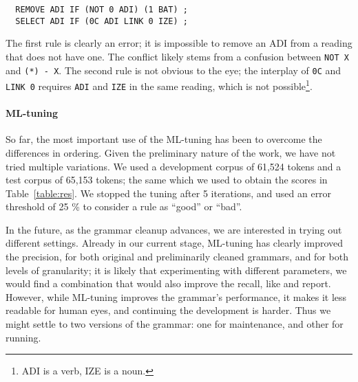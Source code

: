 {{\begin{verbatim}
  REMOVE ADI IF (NOT 0 ADI) (1 BAT) ;
  SELECT ADI IF (0C ADI LINK 0 IZE) ;
\end{verbatim}

\noindent The first rule is clearly an error; it is impossible to remove an ADI from a reading that does not have one.
The conflict likely stems from a confusion between \texttt{NOT X} and \texttt{(*) - X}.
The second rule is not obvious to the eye; the interplay of \texttt{0C} and \texttt{LINK 0} requires 
\texttt{ADI} and \texttt{IZE} in the same reading, which is not possible\footnote{ADI is a verb, IZE is a noun.}.


\paragraph{ML-tuning}

So far, the most important use of the ML-tuning has been to overcome
the differences in ordering. 
Given the preliminary nature of the work, we have not tried multiple
variations. We used a development corpus of 61,524
tokens and a test corpus of 65,153 tokens; the same which we used to
obtain the scores in Table~\ref{table:res}. We stopped the tuning
after 5 iterations, and used an error threshold of 25 \% to consider a
rule as ``good'' or ``bad''. 

In the future, as the grammar cleanup advances, we are interested in
trying out different settings.
Already in our current stage, ML-tuning has clearly
improved the precision, for both original and preliminarily cleaned
grammars, and for both levels of granularity; it is likely that
experimenting with different parameters, we would find a combination
that would also improve the recall, like  
and  report.
However, while ML-tuning improves the grammar's performance, it makes
it less readable for human eyes, and continuing the development is
harder. Thus we might settle to two versions of the grammar: one for
maintenance, and other for running.



}}
